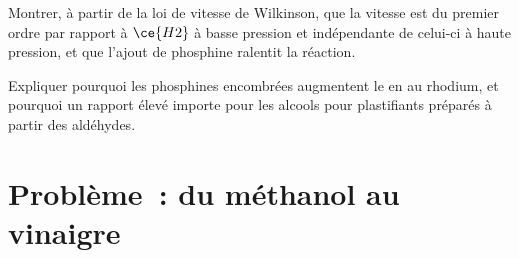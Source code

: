 \begin{exercise}[$\star\star\star$]\label{exo:b3:homogeneous-catalysis:11}
Montrer, à partir de la loi de vitesse de Wilkinson, que la vitesse est du premier ordre par rapport à $\ce{H2}$ à basse pression
et indépendante de celui-ci à haute pression, et que l'ajout de phosphine
ralentit la réaction.
\end{exercise}

\begin{exercise}[$\star\star\star$]\label{exo:b3:homogeneous-catalysis:12}
Expliquer pourquoi les phosphines encombrées augmentent le  en  au rhodium, et pourquoi un rapport
élevé importe pour les alcools pour plastifiants préparés à partir des
aldéhydes.
\end{exercise}

\section{Problème~: du méthanol au vinaigre}

